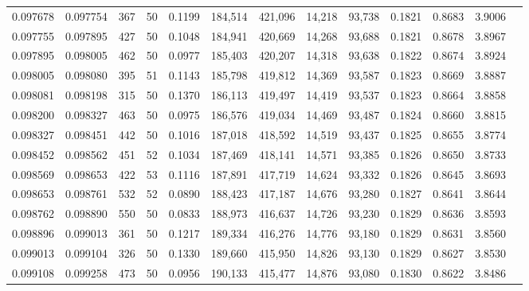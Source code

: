 \begin{tabular}{rrrrrrrrrrrrr}
0.097678 & 0.097754 &   367 &  50 &                                     0.1199 & 184,514 & 421,096 &  14,218 &  93,738 & 0.1821 & 0.8683 & 3.9006 \\
0.097755 & 0.097895 &   427 &  50 &                                     0.1048 & 184,941 & 420,669 &  14,268 &  93,688 & 0.1821 & 0.8678 & 3.8967 \\
0.097895 & 0.098005 &   462 &  50 &                                     0.0977 & 185,403 & 420,207 &  14,318 &  93,638 & 0.1822 & 0.8674 & 3.8924 \\
0.098005 & 0.098080 &   395 &  51 &                                     0.1143 & 185,798 & 419,812 &  14,369 &  93,587 & 0.1823 & 0.8669 & 3.8887 \\
0.098081 & 0.098198 &   315 &  50 &                                     0.1370 & 186,113 & 419,497 &  14,419 &  93,537 & 0.1823 & 0.8664 & 3.8858 \\
0.098200 & 0.098327 &   463 &  50 &                                     0.0975 & 186,576 & 419,034 &  14,469 &  93,487 & 0.1824 & 0.8660 & 3.8815 \\
0.098327 & 0.098451 &   442 &  50 &                                     0.1016 & 187,018 & 418,592 &  14,519 &  93,437 & 0.1825 & 0.8655 & 3.8774 \\
0.098452 & 0.098562 &   451 &  52 &                                     0.1034 & 187,469 & 418,141 &  14,571 &  93,385 & 0.1826 & 0.8650 & 3.8733 \\
0.098569 & 0.098653 &   422 &  53 &                                     0.1116 & 187,891 & 417,719 &  14,624 &  93,332 & 0.1826 & 0.8645 & 3.8693 \\
0.098653 & 0.098761 &   532 &  52 &                                     0.0890 & 188,423 & 417,187 &  14,676 &  93,280 & 0.1827 & 0.8641 & 3.8644 \\
0.098762 & 0.098890 &   550 &  50 &                                     0.0833 & 188,973 & 416,637 &  14,726 &  93,230 & 0.1829 & 0.8636 & 3.8593 \\
0.098896 & 0.099013 &   361 &  50 &                                     0.1217 & 189,334 & 416,276 &  14,776 &  93,180 & 0.1829 & 0.8631 & 3.8560 \\
0.099013 & 0.099104 &   326 &  50 &                                     0.1330 & 189,660 & 415,950 &  14,826 &  93,130 & 0.1829 & 0.8627 & 3.8530 \\
0.099108 & 0.099258 &   473 &  50 &                                     0.0956 & 190,133 & 415,477 &  14,876 &  93,080 & 0.1830 & 0.8622 & 3.8486 \\

\end{tabular}
